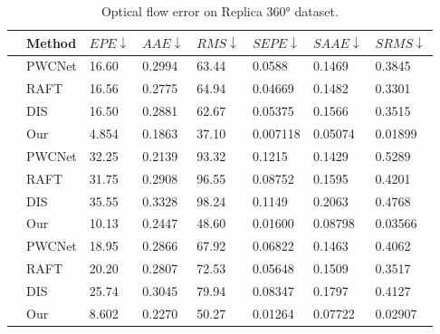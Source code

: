 \begin{table}[h!]
	\centering
	\caption{\label{tab:exp:oferrorquality}%
		Optical flow error on Replica 360° dataset.}
	\begin{tabular}{p{0.2cm}p{1.6cm}p{1.2cm}p{1.2cm}p{1.2cm}p{1.2cm}p{1.2cm}p{1.2cm}}
		\hline
		  &  Method & ${EPE}\downarrow$ & $AAE\downarrow$ & $RMS\downarrow$ & $SEPE\downarrow$ & ${SAAE}\downarrow$ & ${SRMS}\downarrow$ \\
		\hline
		\multirow{3}{*}{\rotatebox[origin=c]{90}{$Circle$}} & PWCNet & 16.60 & 0.2994  & 63.44  & 0.0588 & 0.1469 & 0.3845 \\ 
		 & RAFT & 16.56 & 0.2775  & 64.94 & 0.04669 & 0.1482 & 0.3301 \\
		 & DIS  & 16.50  & 0.2881  & 62.67  & 0.05375 &  0.1566 & 0.3515 \\
		 & Our & {4.854} & {0.1863}  & 37.10 & 0.007118 & 0.05074 & 0.01899 \\ 
		\hline
		\multirow{3}{*}{\rotatebox[origin=c]{90}{$Line$}} & PWCNet & 32.25 & 0.2139  & 93.32 & 0.1215 & 0.1429 & 0.5289 \\ 
		& RAFT & 31.75 & 0.2908 & 96.55 & 0.08752 & 0.1595 & 0.4201 \\ 
		& DIS  & 35.55 & 0.3328 & 98.24 & 0.1149 & 0.2063 &  0.4768 \\
		& Our & 10.13 & 0.2447  & 48.60 & 0.01600 & 0.08798 & 0.03566 \\
		\hline
		\multirow{4}{*}{\rotatebox[origin=c]{90}{$All$}} 
		& PWCNet & 18.95 & 0.2866  & 67.92 & 0.06822 & 0.1463 & 0.4062 \\
		& RAFT & 20.20 & 0.2807  & 72.53  & 0.05648 & 0.1509  & 0.3517 \\
		& DIS  & 25.74  & 0.3045  & 79.94  & 0.08347 & 0.1797  & 0.4127 \\
		& Our & 8.602 & 0.2270  & 50.27 & 0.01264 & 0.07722 & 0.02907 \\
		\hline
	\end{tabular}
\end{table}





